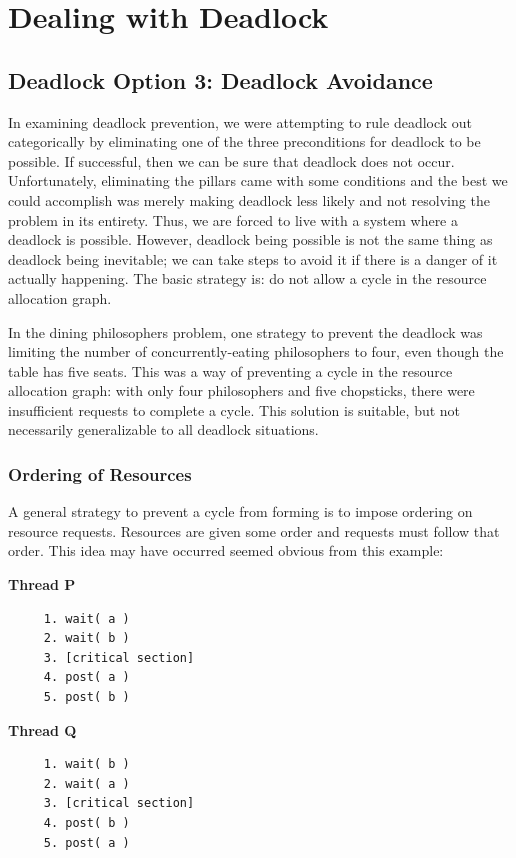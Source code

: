 




\section*{Dealing with Deadlock}

\subsection*{Deadlock Option 3: Deadlock Avoidance}
In examining deadlock prevention, we were attempting to rule deadlock out categorically by eliminating one of the three preconditions for deadlock to be possible. If successful, then we can be sure that deadlock does not occur. Unfortunately, eliminating the pillars came with some conditions and the best we could accomplish was merely making deadlock less likely and not resolving the problem in its entirety. Thus, we are forced to live with a system where a deadlock is possible. However, deadlock being possible is not the same thing as deadlock being inevitable; we can take steps to avoid it if there is a danger of it actually happening. The basic strategy is: do not allow a cycle in the resource allocation graph.

In the dining philosophers problem, one strategy to prevent the deadlock was limiting the number of concurrently-eating philosophers to four, even though the table has five seats. This was a way of preventing a cycle in the resource allocation graph: with only four philosophers and five chopsticks, there were insufficient requests to complete a cycle. This solution is suitable, but not necessarily generalizable to all deadlock situations.

\subsubsection*{Ordering of Resources}
A general strategy to prevent a cycle from forming is to impose ordering on resource requests. Resources are given some order and requests must follow that order. This idea may have occurred seemed obvious from this example:

\begin{multicols}{2}
	\textbf{Thread P}\vspace{-2em}
	\begin{verbatim}
	 1. wait( a ) 
	 2. wait( b )
	 3. [critical section]
	 4. post( a )
	 5. post( b )
  \end{verbatim}
	\columnbreak
	\textbf{Thread Q}\vspace{-2em}
	\begin{verbatim}
	 1. wait( b ) 
	 2. wait( a )
	 3. [critical section]
	 4. post( b )
	 5. post( a )
  \end{verbatim}
\end{multicols}
\vspace{-2em}

